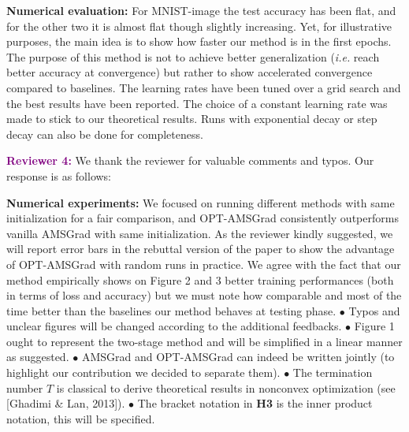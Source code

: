 \documentclass{article}
\begin{document}
\textbf{Numerical evaluation:}  For MNIST-image the test accuracy has been flat, and for the other two it is almost flat though slightly increasing.
Yet, for illustrative purposes, the main idea is to show how faster our method is in the first epochs.
The purpose of this method is not to achieve better generalization (\textit{i.e.} reach better accuracy at convergence) but rather to show accelerated convergence compared to baselines.
The learning rates have been tuned over a grid search and the best results have been reported. The choice of a constant learning rate was made to stick to our theoretical results.
Runs with exponential decay or step decay can also be done for completeness.\vspace{-5pt}


\vspace{0.05in}

\textbf{\textcolor{purple}{Reviewer 4:}} We thank the reviewer for valuable comments and typos. Our response is as follows:\vspace{-5pt}

\textbf{Numerical experiments:}
We focused on running different methods with same initialization for a fair comparison, and OPT-AMSGrad consistently outperforms vanilla AMSGrad with same initialization. As the reviewer kindly suggested, we will report error bars in the rebuttal version of the paper to show the advantage of OPT-AMSGrad with random runs in practice.
We agree with the fact that our method empirically shows on Figure 2 and 3 better training performances (both in terms of loss and accuracy) but we must note how comparable and most of the time better than the baselines our method behaves at testing phase.
$\bullet$ Typos and unclear figures will be changed according to the additional feedbacks.
$\bullet$ Figure 1 ought to represent the two-stage method and will be simplified in a linear manner as suggested. $\bullet$ AMSGrad and OPT-AMSGrad can indeed be written jointly (to highlight our contribution we decided to separate them). $\bullet$ The termination number $T$ is classical to derive theoretical results in nonconvex optimization (see [Ghadimi \& Lan, 2013]). $\bullet$ The bracket notation in \textbf{H3} is the inner product notation, this will be specified.
\end{document}
